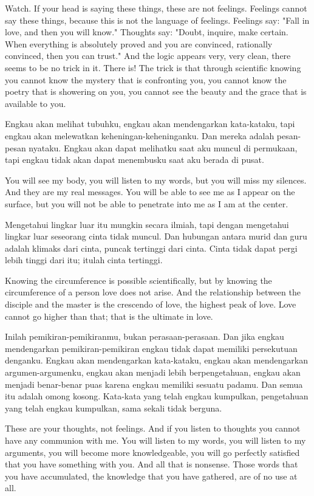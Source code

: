 \english
Watch. If your head is saying these things, these are not feelings. Feelings cannot say these things, because this is not the language of feelings. Feelings say: "Fall in love, and then you will know." Thoughts say: "Doubt, inquire, make certain. When everything is absolutely proved and you are convinced, rationally convinced, then you can trust." And the logic appears very, very clean, there seems to be no trick in it. There is! The trick is that through scientific knowing you cannot know the mystery that is confronting you, you cannot know the poetry that is showering on you, you cannot see the beauty and the grace that is available to you.

\bahasa
Engkau akan melihat tubuhku, engkau akan mendengarkan kata-kataku, tapi engkau akan melewatkan keheningan-keheninganku. Dan mereka adalah pesan-pesan nyataku. Engkau akan dapat melihatku saat aku muncul di permukaan, tapi engkau tidak akan dapat menembusku saat aku berada di pusat.

\english
You will see my body, you will listen to my words, but you will miss my silences. And they are my real messages. You will be able to see me as I appear on the surface, but you will not be able to penetrate into me as I am at the center.

\bahasa
Mengetahui lingkar luar itu mungkin secara ilmiah, tapi dengan mengetahui lingkar luar seseorang cinta tidak muncul. Dan hubungan antara murid dan guru adalah klimaks dari cinta, puncak tertinggi dari cinta. Cinta tidak dapat pergi lebih tinggi dari itu; itulah cinta tertinggi.

\english
Knowing the circumference is possible scientifically, but by knowing the circumference of a person love does not arise. And the relationship between the disciple and the master is the crescendo of love, the highest peak of love. Love cannot go higher than that; that is the ultimate in love.

\bahasa
Inilah pemikiran-pemikiranmu, bukan perasaan-perasaan. Dan jika engkau mendengarkan pemikiran-pemikiran engkau tidak dapat memiliki persekutuan denganku. Engkau akan mendengarkan kata-kataku, engkau akan mendengarkan argumen-argumenku, engkau akan menjadi lebih berpengetahuan, engkau akan menjadi benar-benar puas karena engkau memiliki sesuatu padamu. Dan semua itu adalah omong kosong. Kata-kata yang telah engkau kumpulkan, pengetahuan yang telah engkau kumpulkan, sama sekali tidak berguna.

\english
These are your thoughts, not feelings. And if you listen to thoughts you cannot have any communion with me. You will listen to my words, you will listen to my arguments, you will become more knowledgeable, you will go perfectly satisfied that you have something with you. And all that is nonsense. Those words that you have accumulated, the knowledge that you have gathered, are of no use at all.

